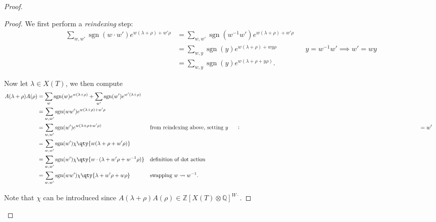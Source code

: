 \begin{proof}

\begin{proof}

We first perform a \emph{reindexing} step:
\begin{align*}   \sum_{w, w'} \operatorname{sgn}(w\cdot w') e^{w(\lambda+\rho) + w'\rho} &= \sum_{w, w'} \operatorname{sgn}(w^{-1} w') e^{w(\lambda+\rho) + w'\rho} \\ &= \sum_{w, y} \operatorname{sgn}(y) e^{w(\lambda+\rho) + wy\rho} && y = w^{-1}w' \implies w' = wy \\ &= \sum_{w, y} \operatorname{sgn}(y) e^{w(\lambda + \rho + y\rho)} .\end{align*}

Now let \(\lambda\in X(T)\), we then compute
\begin{align*}   A(\lambda + \rho) A(\rho) &= \sum_{w} \operatorname{sgn}(w) e^{w(\lambda + \rho)} + \sum_{w'} \operatorname{sgn}(w') e^{w'(\lambda + \rho)}  \\ &= \sum_{w, w'} \operatorname{sgn}(ww') e^{w(\lambda + \rho) + w'\rho} \\ &=  \sum_{w, w'} \operatorname{sgn}(w') e^{w(\lambda + \rho + w'\rho)} && \text{from reindexing above, setting } y\mathrel{\vcenter{:}}= w' \\ &= \sum_{w, w'} \operatorname{sgn}(w') \chi\qty{w(\lambda + \rho + w'\rho)} \\ &= \sum_{w, w'} \operatorname{sgn}(w') \chi\qty{w\cdot (\lambda + w'\rho + w^{-1} \rho)} && \text{definition of dot action}\\ &= \sum_{w, w'} \operatorname{sgn}(ww') \chi\qty{\lambda + w'\rho + w\rho }  && \text{swapping } w\leadsto w^{-1}   .\end{align*}

Note that \(\chi\) can be introduced since
\(A(\lambda + \rho)A(\rho) \in {\mathbb{Z}}[X(T) \otimes{\mathbb{Q}}]^{W\cdot}\).



\end{proof}
\end{proof}

